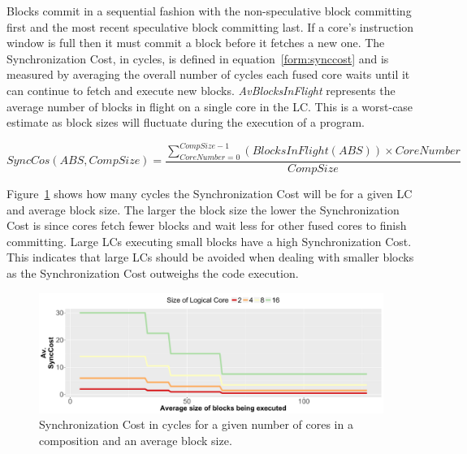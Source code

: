 Blocks commit in a sequential fashion with the non-speculative block committing first and the most recent speculative block committing last.
If a core's instruction window is full then it must commit a block before it fetches a new one.
The Synchronization Cost, in cycles, is defined in equation~\ref{form:synccost} and is measured by averaging the overall number of cycles each fused core waits until it can continue to fetch and execute new blocks.
\textit{AvBlocksInFlight} represents the average number of blocks in flight on a single core in the LC.
This is a worst-case estimate as block sizes will fluctuate during the execution of a program.

\begin{equation}\label{form:synccost}
SyncCos(ABS,CompSize) = \frac{\sum_{CoreNumber=0}^{CompSize-1}\left(BlocksInFlight(ABS)\right) \times CoreNumber }{CompSize}
\end{equation}


Figure~\ref{fig:sync_cost} shows how many cycles the Synchronization Cost will be for a given LC and average block size.
The larger the block size the lower the Synchronization Cost is since cores fetch fewer blocks and wait less for other fused cores to finish committing.
Large LCs executing small blocks have a high Synchronization Cost. 
This indicates that large LCs should be avoided when dealing with smaller blocks as the Synchronization Cost outweighs the code execution.

\begin{figure}[t]
    \centering
    \includegraphics[width=\textwidth]{cases-paper/graphics/limit_study/sync_cost.pdf}

    \caption{Synchronization Cost in cycles for a given number of cores in a composition and an average block size.} %
    \label{fig:sync_cost}
	\vspace{1em}
\end{figure}

